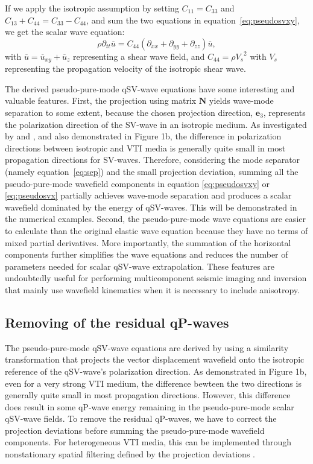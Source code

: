 If we apply the isotropic assumption by setting $C_{11}=C_{33}$ and $C_{13}+C_{44}=C_{33}-C_{44}$,
and sum the two equations in equation~\ref{eq:pseudosvxy}, we get the scalar wave equation:
\begin{equation}
\rho{\partial_{tt}\overline{u}} = 
C_{44}(\partial_{xx}+\partial_{yy}+\partial_{zz}){\overline{u}},
\end{equation}
with $\overline{u}=\overline{u}_{xy}+\overline{u}_{z}$ representing a shear wave field, and $C_{44}=\rho{V_s}^2$ with $V_s$
representing the propagation velocity of the isotropic shear wave.

The derived pseudo-pure-mode qSV-wave equations have some interesting and valuable features.
First, the projection using matrix $\mathbf{N}$ yields wave-mode separation to some
extent, because the chosen projection direction, $\mathbf{e}_3$, represents the polarization direction of
the SV-wave in an isotropic medium.
As investigated by \mbox{\cite{tsvankin.chesnokov:1990}} and \mbox{\cite{psencik:1998}}, and also demonstrated in Figure 1b,
the difference in polarization directions between isotropic and VTI media is
generally quite small in most propagation directions for SV-waves.
Therefore, considering the mode separator (namely equation~\ref{eq:sep}) and the small projection deviation,
summing all the pseudo-pure-mode wavefield components in equation \ref{eq:pseudosvxy} or \ref{eq:pseudosvx}
partially achieves wave-mode separation and produces a scalar wavefield dominated by
the energy of qSV-waves. This will be demonstrated in the numerical examples.
Second, the pseudo-pure-mode wave equations are easier to calculate
than the original elastic wave equation because they have no terms of mixed partial
derivatives. More importantly, the summation of the horizontal components further simplifies the
wave equations and reduces the number of parameters needed for scalar qSV-wave extrapolation. 
These features are undoubtedly useful for performing multicomponent seismic imaging and
inversion that mainly use wavefield kinematics when it is necessary to include anisotropy.

\subsection{Removing of the residual qP-waves}

The pseudo-pure-mode qSV-wave equations are derived by using a similarity transformation
that projects the vector displacement wavefield onto the isotropic reference of
the qSV-wave's polarization direction. 
As demonstrated in Figure 1b, even for a very strong VTI medium, the difference bewteen the two directions
is generally quite small in most propagation directions.
However, this difference does result in some qP-wave energy remaining in the pseudo-pure-mode
scalar qSV-wave fields. To remove the residual qP-waves, we have to correct the projection deviations before summing the pseudo-pure-mode wavefield components.
 For heterogeneous VTI media, this can be implemented through nonstationary spatial
 filtering defined by the projection deviations \cite[]{cheng.kang:2014}.


